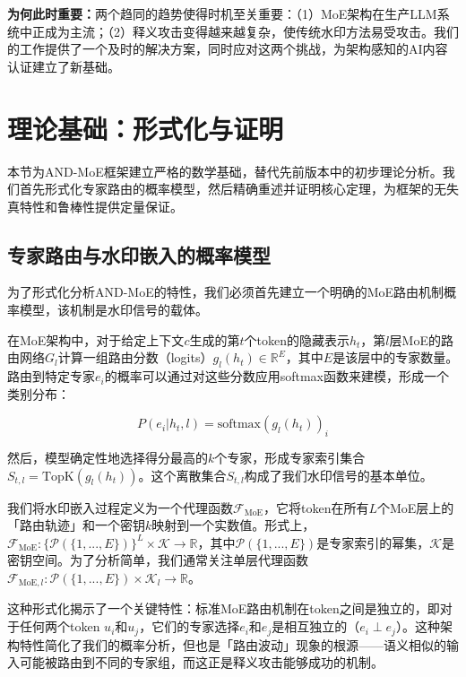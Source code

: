 \documentclass[letterpaper,twocolumn,10pt]{article}
\begin{document}
\textbf{为何此时重要：}两个趋同的趋势使得时机至关重要：（1）MoE架构在生产LLM系统中正成为主流；（2）释义攻击变得越来越复杂，使传统水印方法易受攻击。我们的工作提供了一个及时的解决方案，同时应对这两个挑战，为架构感知的AI内容认证建立了新基础。

\section{理论基础：形式化与证明}

本节为AND-MoE框架建立严格的数学基础，替代先前版本中的初步理论分析。我们首先形式化专家路由的概率模型，然后精确重述并证明核心定理，为框架的无失真特性和鲁棒性提供定量保证。

\subsection{专家路由与水印嵌入的概率模型}

为了形式化分析AND-MoE的特性，我们必须首先建立一个明确的MoE路由机制概率模型，该机制是水印信号的载体。

在MoE架构中，对于给定上下文$c$生成的第$t$个token的隐藏表示$h_t$，第$l$层MoE的路由网络$G_l$计算一组路由分数（logits）$g_l(h_t) \in \mathbb{R}^E$，其中$E$是该层中的专家数量。路由到特定专家$e_i$的概率可以通过对这些分数应用softmax函数来建模，形成一个类别分布：

\begin{equation}
P(e_i | h_t, l) = \text{softmax}(g_l(h_t))_i
\end{equation}

然后，模型确定性地选择得分最高的$k$个专家，形成专家索引集合$S_{t,l} = \text{TopK}(g_l(h_t))$。这个离散集合$S_{t,l}$构成了我们水印信号的基本单位。

我们将水印嵌入过程定义为一个代理函数$\mathcal{F}_{\text{MoE}}$，它将token在所有$L$个MoE层上的「路由轨迹」和一个密钥$k$映射到一个实数值。形式上，$\mathcal{F}_{\text{MoE}}: \{\mathcal{P}(\{1,...,E\})\}^L \times \mathcal{K} \rightarrow \mathbb{R}$，其中$\mathcal{P}(\{1,...,E\})$是专家索引的幂集，$\mathcal{K}$是密钥空间。为了分析简单，我们通常关注单层代理函数$\mathcal{F}_{\text{MoE}, l}: \mathcal{P}(\{1,...,E\}) \times \mathcal{K}_l \rightarrow \mathbb{R}$。

这种形式化揭示了一个关键特性：标准MoE路由机制在token之间是独立的，即对于任何两个token $u_i$和$u_j$，它们的专家选择$e_i$和$e_j$是相互独立的（$e_i \perp e_j$）。这种架构特性简化了我们的概率分析，但也是「路由波动」现象的根源——语义相似的输入可能被路由到不同的专家组，而这正是释义攻击能够成功的机制。
\end{document}
